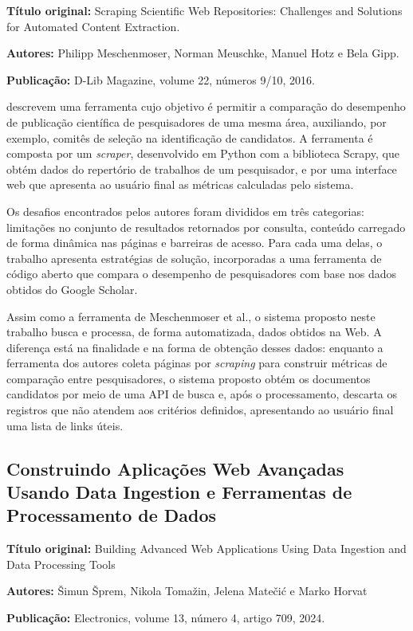 \textbf{Título original:} Scraping Scientific Web Repositories: Challenges and Solutions for Automated Content Extraction.

\textbf{Autores:} Philipp Meschenmoser, Norman Meuschke, Manuel Hotz e Bela Gipp.

\textbf{Publicação:} D-Lib Magazine, volume 22, números 9/10, 2016.

 descrevem uma ferramenta cujo objetivo é permitir a comparação do desempenho de publicação científica de pesquisadores de uma mesma área, auxiliando, por exemplo, comitês de seleção na identificação de candidatos. A ferramenta é composta por um \textit{scraper}, desenvolvido em Python com a biblioteca Scrapy, que obtém dados do repertório de trabalhos de um pesquisador, e por uma interface web que apresenta ao usuário final as métricas calculadas pelo sistema.

Os desafios encontrados pelos autores foram divididos em três categorias: limitações no conjunto de resultados retornados por consulta, conteúdo carregado de forma dinâmica nas páginas e barreiras de acesso. Para cada uma delas, o trabalho apresenta estratégias de solução, incorporadas a uma ferramenta de código aberto que compara o desempenho de pesquisadores com base nos dados obtidos do Google Scholar.

Assim como a ferramenta de Meschenmoser et al., o sistema proposto neste trabalho busca e processa, de forma automatizada, dados obtidos na Web. A diferença está na finalidade e na forma de obtenção desses dados: enquanto a ferramenta dos autores coleta páginas por \textit{scraping} para construir métricas de comparação entre pesquisadores, o sistema proposto obtém os documentos candidatos por meio de uma API de busca e, após o processamento, descarta os registros que não atendem aos critérios definidos, apresentando ao usuário final uma lista de links úteis.

\subsection{Construindo Aplicações Web Avançadas Usando Data Ingestion e Ferramentas de Processamento de Dados}

\textbf{Título original:} Building Advanced Web Applications Using Data Ingestion and
Data Processing Tools

\textbf{Autores:} Šimun Šprem, Nikola Tomažin, Jelena Matečić e Marko Horvat

\textbf{Publicação:} Electronics, volume 13, número 4, artigo 709, 2024.

